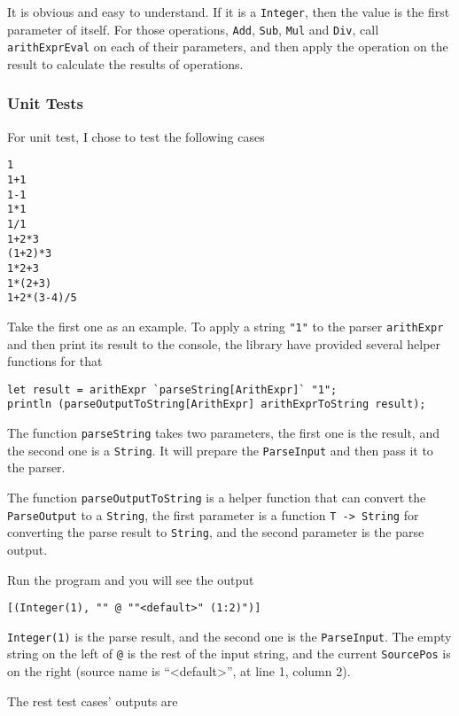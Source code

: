 It is obvious and easy to understand. If it is a \texttt{Integer}, then the value is the first parameter of itself. For those operations, \texttt{Add}, \texttt{Sub}, \texttt{Mul} and \texttt{Div}, call \texttt{arithExprEval} on each of their parameters, and then apply the operation on the result to calculate the results of operations.

\subsubsection{Unit Tests}

For unit test, I chose to test the following cases

\begin{lstlisting}[language={}]
1
1+1
1-1
1*1
1/1
1+2*3
(1+2)*3
1*2+3
1*(2+3)
1+2*(3-4)/5
\end{lstlisting}

Take the first one as an example. To apply a string \texttt{"1"} to the parser \texttt{arithExpr} and then print its result to the console, the library have provided several helper functions for that

\begin{lstlisting}
let result = arithExpr `parseString[ArithExpr]` "1";
println (parseOutputToString[ArithExpr] arithExprToString result);
\end{lstlisting}

The function \texttt{parseString} takes two parameters, the first one is the result, and the second one is a \texttt{String}. It will prepare the \texttt{ParseInput} and then pass it to the parser.

The function \texttt{parseOutputToString} is a helper function that can convert the \texttt{ParseOutput} to a \texttt{String}, the first parameter is a function \texttt{T -> String} for converting the parse result to \texttt{String}, and the second parameter is the parse output.

Run the program and you will see the output

\begin{lstlisting}
[(Integer(1), "" @ ""<default>" (1:2)")]
\end{lstlisting}

\texttt{Integer(1)} is the parse result, and the second one is the \texttt{ParseInput}. The empty string on the left of \texttt{@} is the rest of the input string, and the current \texttt{SourcePos} is on the right (source name is ``<default>'', at line 1, column 2).

The rest test cases' outputs are

